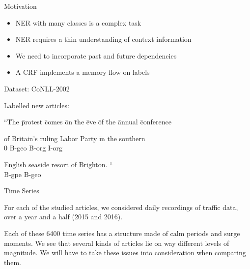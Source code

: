\documentclass[final]{beamer}
\newlength{\onecolwid}
\begin{document}
\begin{frame}[t]
\begin{columns}[t]
\begin{column}{\onecolwid}
\begin{block}{Motivation}
    \begin{itemize}
      \item NER with many classes is a complex task
      \item NER requires a thin understanding of context information
      \item We need to incorporate past and future dependencies
      \item A CRF implements a memory flow on labels
    \end{itemize}

\end{block}

\begin{block}{Dataset: CoNLL-2002}

Labelled new articles:

\begin{tabbing}
``\=The \=protest \=comes \=on \=the \=eve \=of \=the \=annual \=conference \\
         
\end{tabbing}

\begin{tabbing}
of \=Britain\='s \=ruling \=Labor \=Party \=in \=the \=southern \\

0 \>B-geo   \>B-org \>I-org   
\end{tabbing}

\begin{tabbing}
English \=seaside \=resort \=of \=Brighton. `` \\

B-gpe    \>B-geo
\end{tabbing}
\end{block}

\begin{block}{Time Series}

For each of the studied articles, we considered daily recordings of traffic data, over a year and a half (2015 and 2016).

\vspace{5mm}

Each of these 6400 time series has a structure made of calm periods and surge moments. We see that several kinds of articles lie on way different levels of magnitude. We will have to take these issues into consideration when comparing them.


\end{block}
\end{column}
\end{columns}
\end{frame}
\end{document}
